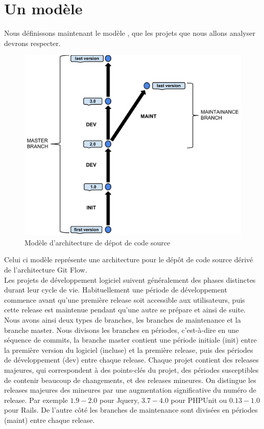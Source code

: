 \section{Un modèle}
\label{sec:model}

Nous définissons maintenant le modèle , que les projets que nous allons analyser devrons respecter.
\begin{figure}[t]
  \centering
  \includegraphics[scale=0.5]{data/figures/periods.pdf}
	\caption{Modèle d'architecture de dépot de code source}
	\label{fig:model}
\end{figure}
Celui ci modèle représente une architecture pour le dépôt de code source dérivé de l'architecture Git Flow.\\
Les projets de développement logiciel suivent généralement des phases distinctes durant leur cycle de vie. Habituellement une période de développement commence avant qu'une première release soit accessible aux utilisateurs, puis cette release est maintenue pendant qu'une autre se prépare et ainsi de suite.\\
Nous avons ainsi deux types de branches, les branches de maintenance et la branche master. Nous divisons les branches en périodes, c'est-à-dire en une séquence de commits, la branche master contient une période initiale (init) entre la première version du logiciel (incluse) et la première release, puis des périodes de développement (dev) entre chaque release. Chaque projet contient des releases majeures, qui correspondent à des points-clés du projet, des périodes susceptibles de contenir beaucoup de changements, et des releases mineures. On distingue les releases majeures des mineures par une augmentation significative du numéro de release. Par exemple $1.9-2.0$ pour Jquery, $3.7-4.0$ pour PHPUnit ou $0.13-1.0$ pour Rails. De l'autre côté les branches de maintenance sont divisées en périodes (maint) entre chaque release.\\
 

